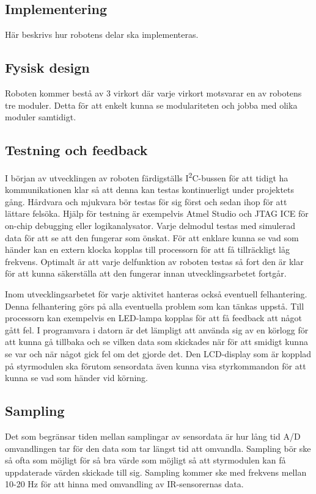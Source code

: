 \documentclass[11pt]{article}
\begin{document}
\begin{flushleft}
\pagebreak
\section{Implementering}
Här beskrivs hur robotens delar ska implementeras. 


\subsection{Fysisk design}
Roboten kommer bestå av 3 virkort där varje virkort motsvarar en av robotens tre moduler. Detta för att enkelt kunna se modulariteten och jobba med olika moduler samtidigt.

\subsection{Testning och feedback}
I början av utvecklingen av roboten färdigställs I\textsuperscript{2}C-bussen för att tidigt ha kommunikationen klar så att denna kan testas kontinuerligt under projektets gång. Hårdvara och mjukvara bör testas för sig först och sedan ihop för att lättare felsöka. Hjälp för testning är exempelvis Atmel Studio och JTAG ICE för on-chip debugging eller logikanalysator. Varje delmodul testas med simulerad data för att se att den fungerar som önskat. För att enklare kunna se vad som händer kan en extern klocka kopplas till processorn för att få tillräckligt låg frekvens. Optimalt är att varje delfunktion av roboten testas så fort den är klar för att kunna säkerställa att den fungerar innan utvecklingsarbetet fortgår.  

Inom utvecklingsarbetet för varje aktivitet hanteras också eventuell felhantering. Denna felhantering görs på alla eventuella problem som kan tänkas uppstå. Till processorn kan exempelvis en LED-lampa kopplas för att få feedback att något gått fel. I programvara i datorn är det lämpligt att använda sig av en körlogg för att kunna gå tillbaka och se vilken data som skickades när för att smidigt kunna se var och när något gick fel om det gjorde det. Den LCD-display som är kopplad på styrmodulen ska förutom sensordata även kunna visa styrkommandon för att kunna se vad som händer vid körning.

\subsection{Sampling}
Det som begränsar tiden mellan samplingar av sensordata är hur lång tid A/D omvandlingen tar för den data som tar längst tid att omvandla. Sampling bör ske så ofta som möjligt för så bra värde som möjligt så att styrmodulen kan få uppdaterade värden skickade till sig. Sampling kommer ske med frekvens mellan 10-20 Hz för att hinna med omvandling av IR-sensorernas data. 


\pagebreak
{}



\end{flushleft}
\end{document}

